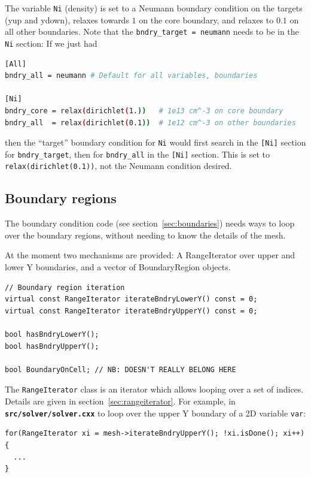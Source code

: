 \documentclass[12pt]{article}
\newcommand{\code}[1]{\texttt{#1}}
\newcommand{\file}[1]{\texttt{\bf #1}}
\begin{document}
The variable \code{Ni} (density) is set to a Neumann boundary condition
on the targets (yup and ydown), relaxes towards $1$ on the core boundary,
and relaxes to $0.1$ on all other boundaries. Note that the \code{bndry\_target = neumann} needs to be in the \code{Ni} section: If we just had
\begin{lstlisting}[language=bash,numbers=none]
[All]
bndry_all = neumann # Default for all variables, boundaries

[Ni]
bndry_core = relax(dirichlet(1.))   # 1e13 cm^-3 on core boundary
bndry_all  = relax(dirichlet(0.1))  # 1e12 cm^-3 on other boundaries
\end{lstlisting}
then the ``target'' boundary condition for \code{Ni} would first search
in the \code{[Ni]} section for \code{bndry\_target}, then for \code{bndry\_all}
in the \code{[Ni]} section. This is set to \code{relax(dirichlet(0.1))}, not
the Neumann condition desired.

\subsection{Boundary regions}

The boundary condition code (see section~\ref{sec:boundaries}) needs
ways to loop over the boundary regions, without needing to know
the details of the mesh.

At the moment two mechanisms are provided: A RangeIterator over upper and lower Y boundaries,
and a vector of BoundaryRegion  objects.

\begin{lstlisting}
// Boundary region iteration
virtual const RangeIterator iterateBndryLowerY() const = 0;
virtual const RangeIterator iterateBndryUpperY() const = 0;

bool hasBndryLowerY();
bool hasBndryUpperY();

bool BoundaryOnCell; // NB: DOESN'T REALLY BELONG HERE
\end{lstlisting}

The \code{RangeIterator} class is an iterator 
which allows looping over a set of indices. Details are given in
section~\ref{sec:rangeiterator}. For example, in
\file{src/solver/solver.cxx} to loop over the upper Y boundary of a 2D variable
\code{var}:
\begin{lstlisting}
for(RangeIterator xi = mesh->iterateBndryUpperY(); !xi.isDone(); xi++) {
  ...
}
\end{lstlisting}
\end{document}
